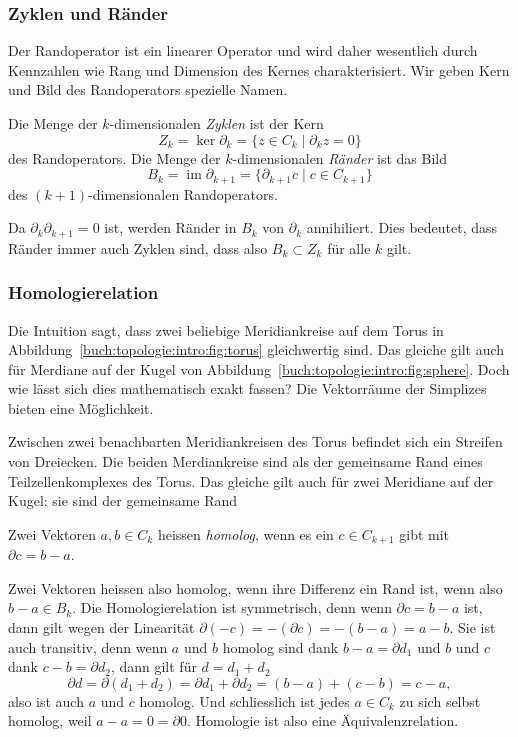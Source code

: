 %
%
\subsubsection{Zyklen und Ränder}
Der Randoperator ist ein linearer Operator und wird daher wesentlich
durch Kennzahlen wie Rang und Dimension des Kernes charakterisiert.
Wir geben Kern und Bild des Randoperators spezielle Namen.

\begin{definition}
Die Menge der $k$-dimensionalen {\em Zyklen} ist der Kern
%
\[
Z_k
=
\ker \partial_k 
=
\{ z\in C_k \mid \partial_kz = 0 \}
\]
des Randoperators.
Die Menge der $k$-dimensionalen {\em Ränder } ist das Bild
%
\[
B_k
=
\operatorname{im} \partial_{k+1}
=
\{ \partial_{k+1}c\mid c\in C_{k+1} \}
\]
des $(k+1)$-dimensionalen Randoperators.
\end{definition}

Da $\partial_{k}\partial_{k+1}=0$ ist, werden Ränder in $B_k$
von $\partial_k$ annihiliert.
Dies bedeutet, dass Ränder immer auch Zyklen sind, dass also
$B_k\subset Z_k$ für alle $k$ gilt.

%
%
\subsubsection{Homologierelation}
Die Intuition sagt, dass zwei beliebige Meridiankreise auf dem Torus in
Abbildung~\ref{buch:topologie:intro:fig:torus}
gleichwertig sind.
Das gleiche gilt auch für Merdiane auf der Kugel von
Abbildung~\ref{buch:topologie:intro:fig:sphere}.
Doch wie lässt sich dies mathematisch exakt fassen?
Die Vektorräume der Simplizes bieten eine Möglichkeit.

Zwischen zwei benachbarten Meridiankreisen des Torus befindet sich ein
Streifen von Dreiecken.
Die beiden Merdiankreise sind als der gemeinsame Rand eines 
Teilzellenkomplexes des Torus.
Das gleiche gilt auch für zwei Meridiane auf der Kugel: sie sind
der gemeinsame Rand 

\begin{definition}[homolog]
Zwei Vektoren $a,b\in C_k$ heissen \emph{homolog}, 
wenn es ein $c\in C_{k+1}$ gibt mit $\partial c=b-a$.
\end{definition}

Zwei Vektoren heissen also homolog, wenn ihre Differenz ein Rand ist,
wenn also $b-a\in B_k$.
Die Homologierelation ist symmetrisch, denn wenn $\partial c=b-a$ ist,
dann gilt wegen der Linearität $\partial (-c) = -(\partial c)=-(b-a)=a-b$.
Sie ist auch transitiv, denn wenn $a$ und $b$ homolog sind dank
$b-a=\partial d_1$ und $b$ und $c$ dank $c-b=\partial d_2$, dann gilt
für $d=d_1+d_2$
\[
\partial d
=
\partial(d_1+d_2)
=
\partial d_1
+
\partial d_2
=
(b-a)+(c-b)
=
c-a,
\]
also ist auch $a$ und $c$ homolog.
Und schliesslich ist jedes $a\in C_k$ zu sich selbst homolog,
weil $a-a=0=\partial 0$.
Homologie ist also eine Äquivalenzrelation.

